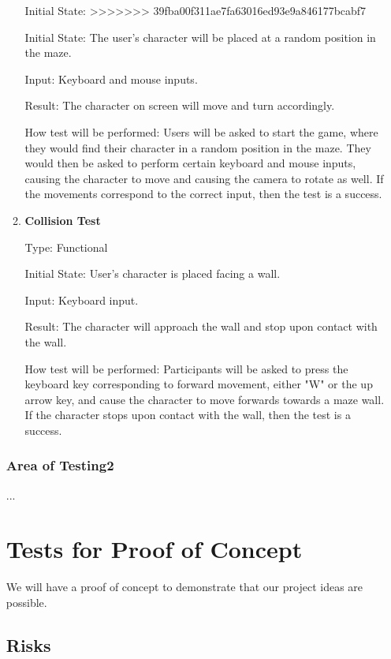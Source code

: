 \documentclass[12pt, titlepage]{article}
\begin{document}
\begin{enumerate}
\begin{enumerate}
Initial State: 
>>>>>>> 39fba00f311ae7fa63016ed93e9a846177bcabf7
					
Initial State: The user's character will be placed at a random position in the maze.
					
Input: Keyboard and mouse inputs.
					
Result: The character on screen will move and turn accordingly.
					
How test will be performed: Users will be asked to start the game, where they would find their character in a random position in the maze. They would then be asked to perform certain keyboard and mouse inputs, causing the character to move and causing the camera to rotate as well. If the movements correspond to the correct input, then the test is a success. 

\item{}
\textbf{Collision Test}

Type: Functional
					
Initial State: User's character is placed facing a wall.
					
Input: Keyboard input.
					
Result: The character will approach the wall and stop upon contact with the wall.  
					
How test will be performed: Participants will be asked to press the keyboard key corresponding to forward movement, either "W" or the up arrow key, and cause the character to move forwards towards a maze wall. If the character stops upon contact with the wall, then the test is a success. 
\end{enumerate}
\subsubsection{Area of Testing2}
...

\section{Tests for Proof of Concept}
We will have a proof of concept to demonstrate that our project ideas are possible.
\subsection{Risks}


\end{enumerate}
\end{document}
